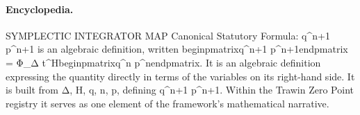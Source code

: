 \paragraph{Encyclopedia.}
SYMPLECTIC INTEGRATOR MAP Canonical Statutory Formula: q\textasciicircum{}n+1 p\textasciicircum{}n+1 is an algebraic definition, written beginpmatrixq\textasciicircum{}n+1 p\textasciicircum{}n+1endpmatrix = Φ\_Δ t\textasciicircum{}Hbeginpmatrixq\textasciicircum{}n p\textasciicircum{}nendpmatrix. It is an algebraic definition expressing the quantity directly in terms of the variables on its right-hand side. It is built from Δ, H, q, n, p, defining q\textasciicircum{}n+1 p\textasciicircum{}n+1. Within the Trawin Zero Point registry it serves as one element of the framework's mathematical narrative.
